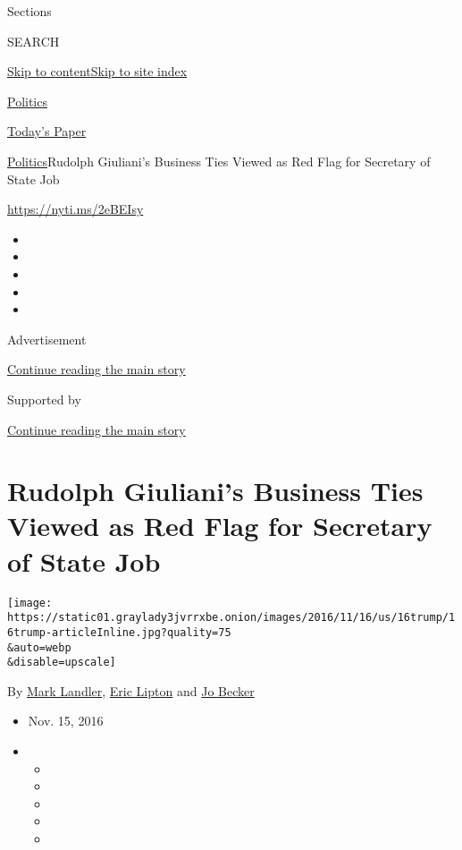 Sections

SEARCH

\protect\hyperlink{site-content}{Skip to
content}\protect\hyperlink{site-index}{Skip to site index}

\href{https://www.nytimes3xbfgragh.onion/section/politics}{Politics}

\href{https://myaccount.nytimes3xbfgragh.onion/auth/login?response_type=cookie\&client_id=vi}{}

\href{https://www.nytimes3xbfgragh.onion/section/todayspaper}{Today's
Paper}

\href{/section/politics}{Politics}\textbar{}Rudolph Giuliani's Business
Ties Viewed as Red Flag for Secretary of State Job

\url{https://nyti.ms/2eBEIsy}

\begin{itemize}
\item
\item
\item
\item
\item
\end{itemize}

Advertisement

\protect\hyperlink{after-top}{Continue reading the main story}

Supported by

\protect\hyperlink{after-sponsor}{Continue reading the main story}

\hypertarget{rudolph-giulianis-business-ties-viewed-as-red-flag-for-secretary-of-state-job}{%
\section{Rudolph Giuliani's Business Ties Viewed as Red Flag for
Secretary of State
Job}\label{rudolph-giulianis-business-ties-viewed-as-red-flag-for-secretary-of-state-job}}

\texttt{[image: https://static01.graylady3jvrrxbe.onion/images/2016/11/16/us/16trump/16trump-articleInline.jpg?quality=75\\\&auto=webp\\\&disable=upscale]}

By \href{http://www.nytimes3xbfgragh.onion/by/mark-landler}{Mark
Landler}, \href{http://www.nytimes3xbfgragh.onion/by/eric-lipton}{Eric
Lipton} and \href{http://www.nytimes3xbfgragh.onion/by/jo-becker}{Jo
Becker}

\begin{itemize}
\item
  Nov. 15, 2016
\item
  \begin{itemize}
  \item
  \item
  \item
  \item
  \item
  \end{itemize}
\end{itemize}

